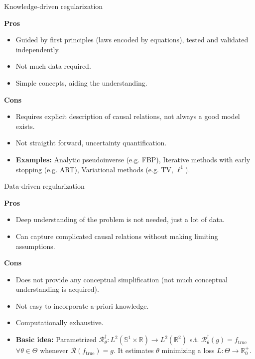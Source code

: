 \begin{frame}{Knowledge-driven regularization}
\begin{block}{\textbf{Pros \Smiley{}}}
\begin{itemize}
\item Guided by first principles (laws encoded by equations), tested and validated independently.
\item Not much data required.
\item Simple concepts, aiding the understanding.
\end{itemize}
\end{block}
\pause
\begin{block}{\textbf{Cons \Frowny{}}}
\begin{itemize}
\item Requires explicit description of causal relations, not always a good model exists.
\item Not straigtht forward, uncertainty quantification.
\end{itemize}
\end{block}
\pause
\begin{itemize}
\item \textbf{Examples:} Analytic pseudoinverse (e.g. FBP), Iterative methods with early stopping (e.g. ART), Variational methods (e.g. TV, $\ell^1$). 
\end{itemize}
\end{frame}

\begin{frame}{Data-driven regularization}
\begin{block}{\textbf{Pros \Smiley{}}}
\begin{itemize}
\item Deep understanding of the problem is not needed, just a lot of data.
\item Can capture complicated causal relations without making limiting assumptions.
\end{itemize}
\end{block}

\pause

\begin{block}{\textbf{Cons \Frowny{}}}
\begin{itemize}
\item Does not provide any conceptual simplification (not much conceptual understanding is acquired).
\item Not easy to incorporate a-priori knowledge. 
\item Computationally exhaustive.
\end{itemize}
\end{block}

\pause

\begin{itemize}
\item \textbf{Basic idea:} Parametrized $\mathcal{R}^{\dagger}_{\theta}: L^2(\mathbb{S}^1\times\mathbb{R})\longrightarrow L^2(\mathbb{R}^2)$ s.t. $\mathcal{R}^{\dagger}_{\theta}(g)=f_{\text{true}}$ $\forall \theta\in\Theta$ whenever $\mathcal{R}(f_{\text{true}})=g$. It estimates $\theta$ minimizing a loss $L:\Theta\longrightarrow \mathbb{R}^+_{0}$.
\end{itemize}
\end{frame}

